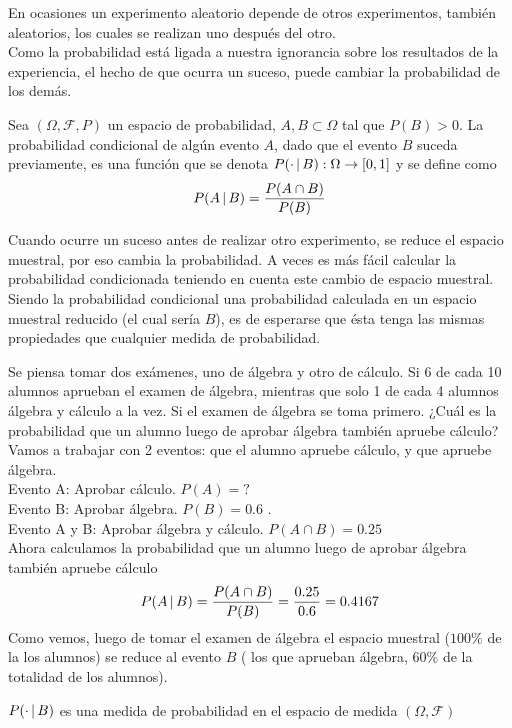 En ocasiones un experimento aleatorio depende de otros experimentos, también aleatorios, los cuales se realizan uno después del otro.\\
Como la probabilidad está ligada a nuestra ignorancia sobre los resultados de la experiencia, el hecho de que ocurra un suceso, puede cambiar la probabilidad de los demás.
\begin{Def}
    Sea $(\Omega,\mathscr{F},P)$ un espacio de probabilidad, $A,B\subset\Omega$ tal que $P(B)>0$. La probabilidad condicional de algún evento $A$, dado que el evento $B$ suceda previamente, es una función que se denota $P(\cdot\thinspace|\thinspace B):\Omega\rightarrow [0,1]$ y se define como $$P(A\thinspace|\thinspace B)=\frac{P(A\cap B)}{P(B)}$$
\end{Def}
Cuando ocurre un suceso antes de realizar otro experimento, se reduce el espacio muestral, por eso cambia la probabilidad. A veces es más fácil calcular la probabilidad condicionada teniendo en cuenta este cambio de espacio muestral. 
    Siendo la probabilidad condicional una probabilidad calculada en un espacio muestral reducido (el cual sería $B$), es de esperarse que ésta tenga las mismas propiedades que cualquier medida de probabilidad.
\begin{Ejm}
Se piensa tomar dos exámenes, uno de álgebra y otro de cálculo.
   Si 6 de cada 10 alumnos aprueban el examen de álgebra, mientras que solo 1 de cada 4 alumnos  álgebra y cálculo a la vez. Si el examen de álgebra se toma primero. ¿Cuál es la probabilidad que un alumno luego de aprobar álgebra también apruebe cálculo?
    Vamos a trabajar con 2 eventos: que el alumno apruebe cálculo, y que apruebe álgebra.\\
    Evento A: Aprobar cálculo. $P(A) = ?$\\
    Evento B: Aprobar álgebra. $P(B) =0.6$ .\\
    Evento A y B: Aprobar álgebra y cálculo. $P(A\cap B) =0.25$\\
    Ahora calculamos la probabilidad que un alumno luego de aprobar álgebra también apruebe cálculo
    $$P(A\thinspace|\thinspace B)=\frac{P(A\cap B)}{P(B)}=\frac{0.25}{0.6}=0.4167$$
   Como vemos, luego de tomar el examen de álgebra el espacio muestral ($100\%$ de la los alumnos) se reduce al evento $B$ ( los que aprueban álgebra, $60 \%$ de la totalidad de los alumnos).
  \end{Ejm}
\begin{Prop}
    $P(\cdot\thinspace|\thinspace B)$ es una medida de probabilidad en el espacio de medida $(\Omega,\mathscr{F})$
\end{Prop}
